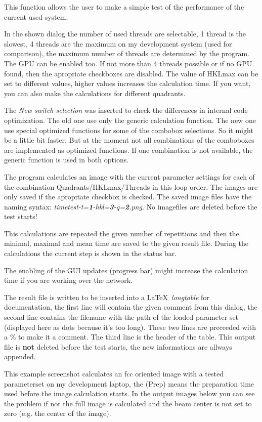 \documentclass[11pt]{article} %
\begin{document}
This function allows the user to make a simple test of the performance of the current used system.

In the shown dialog the number of used threads are selectable, 1 thread is the slowest, 4 threads are the maximum on my development system (used for comparison), the maximum number of threads are determined by the program. The GPU can be enabled too. If not more than 4 threads possible or if no GPU found, then the apropriate checkboxes are disabled. The value of HKLmax can be set to different values, higher values increases the calculation time. If you want, you can also make the calculations for different quadrants.

The {\it New switch selection} was inserted to check the differences in internal code optimization. The old one use only the generic calculation function. The new one use special optimized functions for some of the combobox selections. So it might be a little bit faster. But at the moment not all combinations of the comboboxes are implemented as optimized functions. If one combination is not available, the generic function is used in both options.

The program calculates an image with the current parameter settings for each of the combination Quadrants/HKLmax/Threads in this loop order. The images are only saved if the apropriate checkbox is checked. The saved image files have the naming syntax: {\it timetest-t={\bf 1}-hkl={\bf 3}-q={\bf 2}.png}. No imagefiles are deleted before the test starts!

This calculations are repeated the given number of repetitions and then the minimal, maximal and mean time are saved to the given result file. During the calculations the current step is shown in the status bar.

The enabling of the GUI updates (progress bar) might increase the calculation time if you are working over the network.

The result file is written to be inserted into a \LaTeX\  {\it longtable} for documentation, the first line will contain the given comment from this dialog, the second line contains the filename with the path of the loaded parameter set (displayed here as dots because it's too long). These two lines are preceeded with a \% to make it a comment. The third line is the header of the table. This output file is {\bf not} deleted before the test starts, the new informations are allways appended.

This example screenshot calculates an fcc oriented image with a tested parameterset on my development laptop, the (Prep) means the preparation time used before the image calculation starts. In the output images below you can see the problem if not the full image is calculated and the beam center is not set to zero (e.g. the center of the image).
\end{document}
